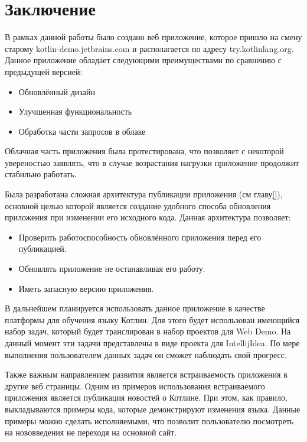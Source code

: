 \chapter*{Заключение}
	В рамках данной работы было создано веб приложение, которое пришло на смену старому kotlin-demo.jetbrains.com и располагается по адресу try.kotlinlang.org. Данное приложение обладает следующими преимуществами по сравнению с предыдущей версией:
\begin{itemize}
	\item Обновлённый дизайн
	\item Улучшенная функциональность
	\item Обработка части запросов в облаке 
\end{itemize}
	
	Облачная часть приложения была протестирована, что позволяет с некоторой увереностью заявлять, что в случае возрастания нагрузки приложение продолжит стабильно работать.
	
	Была разработана сложная архитектура публикации приложения (см главу\ref{}), основной целью которой является создание удобного способа обновления приложения при изменении его исходного кода. Данная архитектура позволяет:
	
\begin{itemize}
	\item Проверить работоспособность обновлённого приложения перед его публикацией.
	\item Обновлять приложение не останавливая его работу.
	\item Иметь запасную версию приложения.
\end{itemize}

	В дальнейшем планируется использовать данное приложение в качестве платформы для обучения языку Котлин. Для этого будет использован имеющийся набор задач, который будет транслирован в набор проектов для Web Demo. На данный момент эти задачи представлены в виде проекта для IntellijIdea. По мере выполнения пользователем данных задач он сможет наблюдать свой прогресс.
	
	Также важным направлением развития является встраиваемость приложения в другие веб страницы. Одним из примеров использования встраиваемого приложения является публикация новостей о Котлине. При этом, как правило, выкладываются примеры кода, которые демонстрируют изменения языка. Данные примеры можно сделать исполняемыми, что позволит пользователю посмотреть на нововведения не переходя на основной сайт.